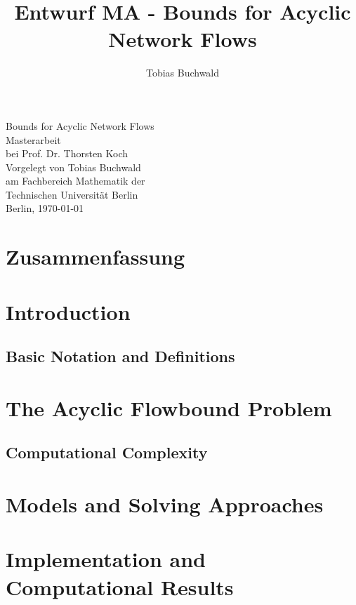 \documentclass[a4paper]{book}
\theoremstyle{definition}
\theoremstyle{Tobi}
\begin{document}
\title{Entwurf MA - Bounds for Acyclic Network Flows}

\author{Tobias Buchwald}



\begin{center} 

\Huge{Bounds for Acyclic Network Flows}\\ \vspace{12 cm}
\Large{Masterarbeit\\ bei Prof. Dr. Thorsten Koch}\\ \vspace{1cm}
\large{Vorgelegt von Tobias Buchwald}\\
\large{am Fachbereich Mathematik der \\Technischen Universit\"at Berlin}\\
\vspace{2cm}
\large{Berlin,  \today}

\end{center} 
\newpage
\mbox{}
\newpage

\newpage
\mbox{}
\newpage
\tableofcontents
\newpage
\chapter*{Zusammenfassung}
\newpage
\chapter{Introduction} 
\newpage
% 
\section{Basic Notation and Definitions}
\newpage
\chapter{The Acyclic Flowbound Problem}
\section{Computational Complexity}
\newpage
\chapter{Models and Solving Approaches}
\newpage
\chapter{Implementation and Computational Results}


\newpage
\newpage
{}

% 

\nocite{*}
\end{document}
